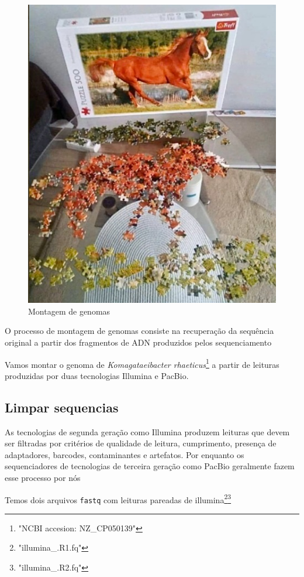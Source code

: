 \documentclass[letter,11pt]{book}
\begin{document}
\begin{figure}[h!]
\centering
 \includegraphics[width=11.5cm]{Figs/montagem_de_genoma.jpeg}
 \caption{\label{fig:fastqc}Montagem de genomas}
\end{figure}


O processo de montagem de genomas consiste na recuperação da sequência original a partir dos fragmentos de ADN produzidos pelos sequenciamento

Vamos montar o genoma de \emph{Komagataeibacter rhaeticus}\footnote{"NCBI accesion: NZ\_CP050139"} a partir de leituras produzidas por duas tecnologias Illumina e PacBio.

\subsection{Limpar sequencias}
As tecnologias de segunda geração como Illumina produzem leituras que devem ser filtradas por critérios de qualidade de leitura, cumprimento, presença de adaptadores, barcodes, contaminantes e artefatos.
Por enquanto os sequenciadores de tecnologias de terceira geração como PacBio geralmente fazem esse processo por nós

Temos dois arquivos \Verb+fastq+ com leituras pareadas de illumina\footnote{"illumina\_.R1.fq"}\footnote{"illumina\_.R2.fq"}
\end{document}
